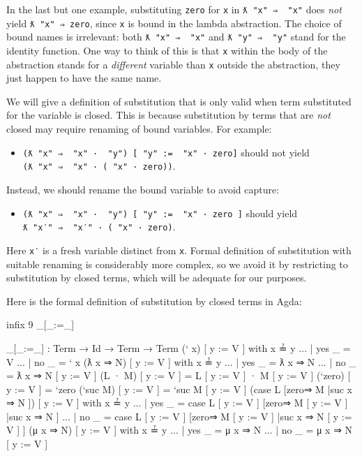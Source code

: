 In the last but one example, substituting \texttt{\textasciigrave{}zero}
for \texttt{x} in \texttt{ƛ\ "x"\ ⇒\ \textasciigrave{}\ "x"} does
\emph{not} yield \texttt{ƛ\ "x"\ ⇒\ \textasciigrave{}zero}, since
\texttt{x} is bound in the lambda abstraction. The choice of bound names
is irrelevant: both \texttt{ƛ\ "x"\ ⇒\ \textasciigrave{}\ "x"} and
\texttt{ƛ\ "y"\ ⇒\ \textasciigrave{}\ "y"} stand for the identity
function. One way to think of this is that \texttt{x} within the body of
the abstraction stands for a \emph{different} variable than \texttt{x}
outside the abstraction, they just happen to have the same name.

We will give a definition of substitution that is only valid when term
substituted for the variable is closed. This is because substitution by
terms that are \emph{not} closed may require renaming of bound
variables. For example:

\begin{itemize}
\tightlist
\item
  \texttt{(ƛ\ "x"\ ⇒\ \textasciigrave{}\ "x"\ ·\ \textasciigrave{}\ "y")\ {[}\ "y"\ :=\ \textasciigrave{}\ "x"\ ·\ \textasciigrave{}zero{]}}
  should not yield
  \texttt{(ƛ\ "x"\ ⇒\ \textasciigrave{}\ "x"\ ·\ (\textasciigrave{}\ "x"\ ·\ \textasciigrave{}zero))}.
\end{itemize}

Instead, we should rename the bound variable to avoid capture:

\begin{itemize}
\tightlist
\item
  \texttt{(ƛ\ "x"\ ⇒\ \textasciigrave{}\ "x"\ ·\ \textasciigrave{}\ "y")\ {[}\ "y"\ :=\ \textasciigrave{}\ "x"\ ·\ \textasciigrave{}zero\ {]}}
  should yield
  \texttt{ƛ\ "x′"\ ⇒\ \textasciigrave{}\ "x′"\ ·\ (\textasciigrave{}\ "x"\ ·\ \textasciigrave{}zero)}.
\end{itemize}

Here \texttt{x′} is a fresh variable distinct from \texttt{x}. Formal
definition of substitution with suitable renaming is considerably more
complex, so we avoid it by restricting to substitution by closed terms,
which will be adequate for our purposes.

Here is the formal definition of substitution by closed terms in Agda:

\begin{fence}
\begin{code}
infix 9 _[_:=_]

_[_:=_] : Term → Id → Term → Term
(` x) [ y := V ] with x ≟ y
... | yes _          =  V
... | no  _          =  ` x
(ƛ x ⇒ N) [ y := V ] with x ≟ y
... | yes _          =  ƛ x ⇒ N
... | no  _          =  ƛ x ⇒ N [ y := V ]
(L · M) [ y := V ]   =  L [ y := V ] · M [ y := V ]
(`zero) [ y := V ]   =  `zero
(`suc M) [ y := V ]  =  `suc M [ y := V ]
(case L [zero⇒ M |suc x ⇒ N ]) [ y := V ] with x ≟ y
... | yes _          =  case L [ y := V ] [zero⇒ M [ y := V ] |suc x ⇒ N ]
... | no  _          =  case L [ y := V ] [zero⇒ M [ y := V ] |suc x ⇒ N [ y := V ] ]
(μ x ⇒ N) [ y := V ] with x ≟ y
... | yes _          =  μ x ⇒ N
... | no  _          =  μ x ⇒ N [ y := V ]
\end{code}
\end{fence}

